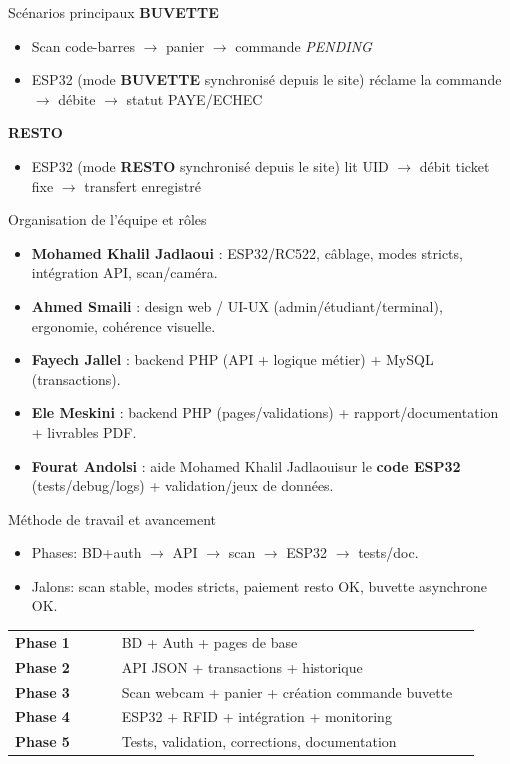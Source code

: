 \documentclass[aspectratio=169,11pt]{beamer}
\newcommand{\MemberA}{Ele Meskini}
\newcommand{\MemberB}{Mohamed Khalil Jadlaoui}
\newcommand{\MemberC}{Fayech Jallel}
\newcommand{\MemberD}{Fourat Andolsi}
\newcommand{\MemberE}{Ahmed Smaili}
\begin{document}
\begin{frame}{Scénarios principaux}
  \textbf{BUVETTE}
  \begin{itemize}
    \item Scan code-barres \(\rightarrow\) panier \(\rightarrow\) commande \textit{PENDING}
    \item ESP32 (mode \textbf{BUVETTE} synchronisé depuis le site) réclame la commande \(\rightarrow\) débite \(\rightarrow\) statut PAYE/ECHEC
  \end{itemize}
  \vspace{6pt}
  \textbf{RESTO}
  \begin{itemize}
    \item ESP32 (mode \textbf{RESTO} synchronisé depuis le site) lit UID \(\rightarrow\) débit ticket fixe \(\rightarrow\) transfert enregistré
  \end{itemize}
\end{frame}

\begin{frame}{Organisation de l’équipe et rôles}
  \begin{itemize}
    \item \textbf{\MemberB} : ESP32/RC522, câblage, modes stricts, intégration API, scan/caméra.
    \item \textbf{\MemberE} : design web / UI-UX (admin/étudiant/terminal), ergonomie, cohérence visuelle.
    \item \textbf{\MemberC} : backend PHP (API + logique métier) + MySQL (transactions).
    \item \textbf{\MemberA} : backend PHP (pages/validations) + rapport/documentation + livrables PDF.
    \item \textbf{\MemberD} : aide \MemberB sur le \textbf{code ESP32} (tests/debug/logs) + validation/jeux de données.
  \end{itemize}
\end{frame}

\begin{frame}{Méthode de travail et avancement}
  \begin{itemize}
    \item Phases: BD+auth \(\rightarrow\) API \(\rightarrow\) scan \(\rightarrow\) ESP32 \(\rightarrow\) tests/doc.
    \item Jalons: scan stable, modes stricts, paiement resto OK, buvette asynchrone OK.
  \end{itemize}
  \vspace{6pt}
  \small
  \begin{tabular}{p{0.22\linewidth} p{0.74\linewidth}}
    \textbf{Phase 1} & BD + Auth + pages de base \\
    \textbf{Phase 2} & API JSON + transactions + historique \\
    \textbf{Phase 3} & Scan webcam + panier + création commande buvette \\
    \textbf{Phase 4} & ESP32 + RFID + intégration + monitoring \\
    \textbf{Phase 5} & Tests, validation, corrections, documentation \\
  \end{tabular}
\end{frame}
\end{document}
